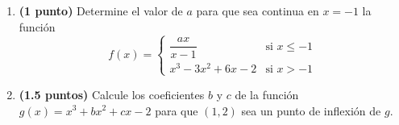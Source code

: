 
\begin{enumerate}[label=\alph*)]
\item \textbf{(1 punto)} Determine el valor de $a$ para que sea continua en $x=-1$ la función
\[
f(x)=\begin{cases}
\dfrac{ax}{x-1} & \text{si }x\leq-1\\[4pt]
x^3-3x^2+6x-2 & \text{si }x>-1
\end{cases}
\]
\item \textbf{(1.5 puntos)} Calcule los coeficientes $b$ y $c$ de la función $g(x)=x^3+bx^2+cx-2$ para que $(1,2)$ sea un punto de inflexión de $g$.
\end{enumerate}
